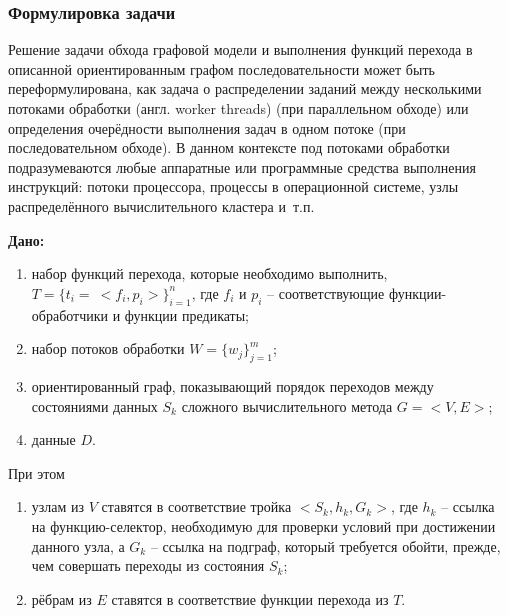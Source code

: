 \def\notedate{2023.01.23}
\def\currentauthor{Тришин И.В. (РК6-11М)}
\subsubsection{Формулировка задачи}
Решение задачи обхода графовой модели и выполнения функций перехода в описанной ориентированным графом последовательности может быть переформулирована, как задача о распределении заданий между несколькими потоками обработки (англ. worker threads) (при параллельном обходе) или определения очерёдности выполнения задач в одном потоке (при последовательном обходе). В данном контексте под потоками обработки подразумеваются любые аппаратные или программные средства выполнения инструкций: потоки процессора, процессы в операционной системе, узлы распределённого вычислительного кластера и~т.п.

\textbf{Дано:}
\begin{enumerate}[label=\arabic*)]
	\item набор функций перехода, которые необходимо выполнить, $T=\{t_i =\ <f_i, p_i>\}_{i=1}^n$, где $f_i$ и $p_i$ -- соответствующие функции-обработчики и функции предикаты;
	\item набор потоков обработки $W=\{w_j\}_{j=1}^m$;
	\item ориентированный граф, показывающий порядок переходов между состояниями данных $S_k$ сложного вычислительного метода $G = <V, E>$;
	\item данные $D$.
\end{enumerate}
При этом
\begin{enumerate}[label=\arabic*)]
	\item узлам из $V$ ставятся в соответствие тройка $<S_k, h_k, G_k>$, где $h_k$ -- ссылка на функцию-селектор, необходимую для проверки условий при достижении данного узла, а $G_k$ -- ссылка на подграф, который требуется обойти, прежде, чем совершать переходы из состояния $S_k$;
	\item рёбрам из $E$ ставятся в соответствие функции перехода из $T$.
\end{enumerate}

